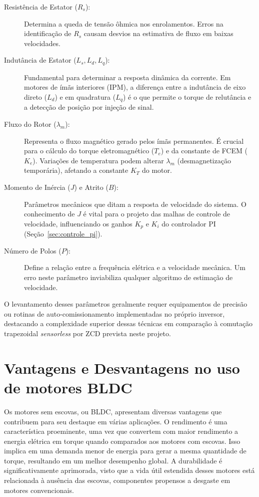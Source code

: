 \begin{description}
    \item[Resistência de Estator ($R_s$):] Determina a queda de tensão ôhmica nos enrolamentos. Erros na identificação de $R_s$ causam desvios na estimativa de fluxo em baixas velocidades.
    
    \item[Indutância de Estator ($L_s, L_d, L_q$):] Fundamental para determinar a resposta dinâmica da corrente. Em motores de ímãs interiores (IPM), a diferença entre a indutância de eixo direto ($L_d$) e em quadratura ($L_q$) é o que permite o torque de relutância e a detecção de posição por injeção de sinal.
    
    \item[Fluxo do Rotor ($\lambda_m$):] Representa o fluxo magnético gerado pelos ímãs permanentes. É crucial para o cálculo do torque eletromagnético ($T_e$) e da constante de FCEM ($K_e$). Variações de temperatura podem alterar $\lambda_m$ (desmagnetização temporária), afetando a constante $K_T$ do motor.
    
    \item[Momento de Inércia ($J$) e Atrito ($B$):] Parâmetros mecânicos que ditam a resposta de velocidade do sistema. O conhecimento de $J$ é vital para o projeto das malhas de controle de velocidade, influenciando os ganhos $K_p$ e $K_i$ do controlador PI (Seção~\ref{sec:controle_pi}).
    
    \item[Número de Polos ($P$):] Define a relação entre a frequência elétrica e a velocidade mecânica. Um erro neste parâmetro inviabiliza qualquer algoritmo de estimação de velocidade.
\end{description}

O levantamento desses parâmetros geralmente requer equipamentos de precisão ou rotinas de auto-comissionamento implementadas no próprio inversor, destacando a complexidade superior dessas técnicas em comparação à comutação trapezoidal \textit{sensorless} por ZCD prevista neste projeto.


 \section{Vantagens e Desvantagens no uso de motores BLDC} 
 Os motores sem escovas, ou BLDC, apresentam diversas vantagens que contribuem para seu destaque em várias aplicações. O rendimento é uma característica proeminente, uma vez que convertem com maior rendimento a energia elétrica em torque quando comparados aos motores com escovas. Isso implica em uma demanda menor de energia para gerar a mesma quantidade de torque, resultando em um melhor desempenho global. A durabilidade é significativamente aprimorada, visto que a vida útil estendida desses motores está relacionada à ausência das escovas, componentes propensos a desgaste em motores convencionais. 

